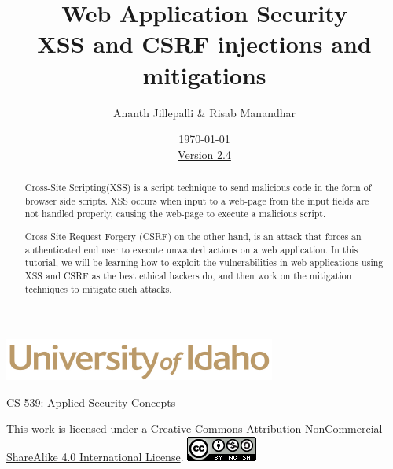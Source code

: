 \documentclass[12pt]{extarticle}
\begin{document}
\title{ Web Application Security\\XSS and CSRF injections and mitigations}
\author{Ananth Jillepalli \& Risab Manandhar}
\date{\today \\ \hyperref[changelog]{Version 2.4}}
\renewcommand{\abstractname}{Summary}
\begin{titlepage}
\maketitle
{}
\begin{center}
\includegraphics[scale=.5]{UofI}

\large{CS 539: Applied Security Concepts}

\vskip 40pt

\end{center}
\begin{abstract}
Cross-Site Scripting(XSS) is a script technique to send malicious code in the form of browser side scripts. XSS occurs when input to a web-page from the input fields are not handled properly, causing the web-page to execute a malicious script.

\vspace{4mm}
\noindent
Cross-Site Request Forgery (CSRF) on the other hand, is an attack that forces an authenticated end user to execute unwanted actions on a web application. In this tutorial, we will be learning how to exploit the vulnerabilities in web applications using XSS and CSRF as the best ethical hackers do, and then work on the mitigation techniques to mitigate such attacks.
\end{abstract}


\vfill
\begin{center}
This work is licensed under a \href{https://creativecommons.org/licenses/by-nc-sa/4.0/legalcode}{Creative Commons Attribution-NonCommercial-ShareAlike 4.0 International License}.
\vskip 10pt
\includegraphics[scale=.5]{cc}
\end{center}

\end{titlepage}

\end{document}
